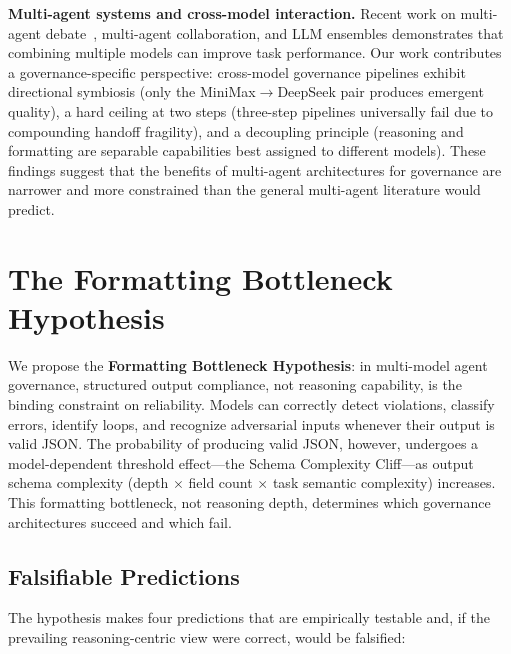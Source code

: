 \documentclass[11pt,a4paper]{article}
\begin{document}
\textbf{Multi-agent systems and cross-model interaction.} Recent work on multi-agent debate~\cite{du2023improving}, multi-agent collaboration, and LLM ensembles demonstrates that combining multiple models can improve task performance. Our work contributes a governance-specific perspective: cross-model governance pipelines exhibit directional symbiosis (only the MiniMax$\rightarrow$DeepSeek pair produces emergent quality), a hard ceiling at two steps (three-step pipelines universally fail due to compounding handoff fragility), and a decoupling principle (reasoning and formatting are separable capabilities best assigned to different models). These findings suggest that the benefits of multi-agent architectures for governance are narrower and more constrained than the general multi-agent literature would predict.

\section{The Formatting Bottleneck Hypothesis}

We propose the \textbf{Formatting Bottleneck Hypothesis}: in multi-model agent governance, structured output compliance, not reasoning capability, is the binding constraint on reliability. Models can correctly detect violations, classify errors, identify loops, and recognize adversarial inputs whenever their output is valid JSON. The probability of producing valid JSON, however, undergoes a model-dependent threshold effect---the Schema Complexity Cliff---as output schema complexity (depth $\times$ field count $\times$ task semantic complexity) increases. This formatting bottleneck, not reasoning depth, determines which governance architectures succeed and which fail.

\subsection{Falsifiable Predictions}

The hypothesis makes four predictions that are empirically testable and, if the prevailing reasoning-centric view were correct, would be falsified:
\end{document}
